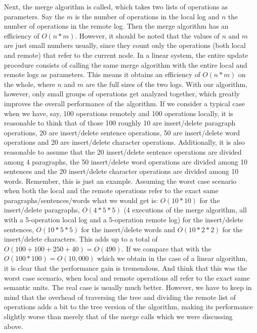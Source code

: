 Next, the merge algorithm is called, which takes two lists of operations as parameters. Say the $m$ is the
number of operations in the local log and $n$ the number of operations in the remote log. Then the merge
algorithm has an efficiency of $O(n*m)$. However, it should be noted that the values of $n$ and $m$ are
just small numbers usually, since they count only the operations (both local and remote) that refer to the
current node. In a linear system, the entire update procedure consists of calling the same merge algorithm
with the entire local and remote logs as parameters. This means it obtains an efficiency of $O(n*m)$ on
the whole, where $n$ and $m$ are the full sizes of the two logs. With our algorithm, however, only small
groups of operations get analyzed together, which greatly improves the overall performance of the algorithm.
If we consider a typical case when we have, say, 100 operations remotely and 100 operations locally, it is
reasonable to think that of those 100 roughly 10 are insert/delete paragraph operations, 20 are insert/delete
sentence operations, 50 are insert/delete word operations and 20 are insert/delete character operations.
Additionally, it is also reasonable to assume that the 20 insert/delete sentence operations are divided
among 4 paragraphs, the 50 insert/delete word operations are divided among 10 sentences and the 20 insert/delete
character operations are divided among 10 words. Remember, this is just an example. Assuming the worst
case scenario when both the local and the remote operations refer to the exact same paragraphs/sentences/words
what we would get is: $O(10*10)$ for the insert/delete paragraphs, $O(4*5*5)$ (4 executions of the merge
algorithm, all with a 5-operation local log and a 5-operation remote log) for the insert/delete sentences,
$O(10*5*5)$ for the insert/delete words and $O(10*2*2)$ for the insert/delete characters. This adds up to
a total of $O(100+100+250+40)=O(490)$. If we compare that with the $O(100*100)=O(10,000)$ which we obtain
in the case of a linear algorithm, it is clear that the performance gain is tremendous. And think that this
was the worst case scenario, when local and remote operations all refer to the exact same semantic units.
The real case is usually much better. However, we have to keep in mind that the overhead of traversing the
tree and dividing the remote list of operations adds a bit to the tree version of the algorithm, making its
performance slightly worse than merely that of the merge calls which we were discussing above.

